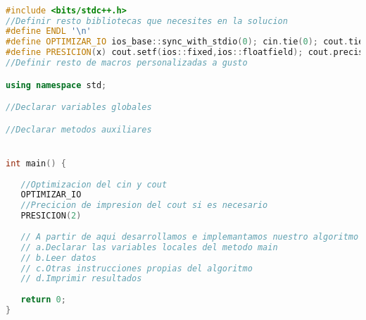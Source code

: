 \begin{lstlisting}[language=C++]

#include <bits/stdc++.h>
//Definir resto bibliotecas que necesites en la solucion
#define ENDL '\n'
#define OPTIMIZAR_IO ios_base::sync_with_stdio(0); cin.tie(0); cout.tie(0);
#define PRESICION(x) cout.setf(ios::fixed,ios::floatfield); cout.precision(x);
//Definir resto de macros personalizadas a gusto

using namespace std;

//Declarar variables globales

//Declarar metodos auxiliares


int main() {
   
   //Optimizacion del cin y cout
   OPTIMIZAR_IO
   //Precicion de impresion del cout si es necesario
   PRESICION(2)
	
   // A partir de aqui desarrollamos e implemantamos nuestro algoritmo el cual debe incluir:
   // a.Declarar las variables locales del metodo main
   // b.Leer datos
   // c.Otras instrucciones propias del algoritmo 
   // d.Imprimir resultados
	
   return 0;
}
\end{lstlisting}
